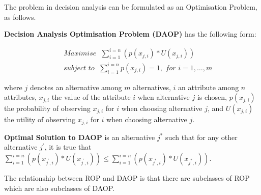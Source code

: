 \documentclass[graybox]{svmult}
\newcommand{\zi}[1]{\textit{#1}}
\newcommand{\xb}[1]{\textbf{#1}}
\newcommand{\ROP}{ROP}
\begin{document}
The problem in decision analysis can be formulated as an Optimisation Problem, as follows.

\begin{definition}\label{d:daop}
\xb{Decision Analysis Optimisation Problem (DAOP)} has the following form:

\begin{eqnarray*}
& & \zi{Maximise }\; \sum_{i=1}^{i=n}(p(x_{j,i}) * U(x_{j,i})) \\
& & \zi{subject to }\; \sum_{i=1}^{i=n}p(x_{j,i}) = 1, \zi{ for } i = 1, \ldots, m
\end{eqnarray*}

where $j$ denotes an alternative among $m$ alternatives, $i$ an attribute among $n$ attributes, $x_{j,i}$ the value of the attribute $i$ when alternative $j$ is chosen, $p(x_{j,i})$ the probability of observing $x_{j,i}$ for $i$ when choosing alternative $j$, and $U(x_{j,i})$ the utility of observing $x_{j,i}$ for $i$ when choosing alternative $j$. 
\end{definition}

\begin{definition}\label{d:daop-solution}
\xb{Optimal Solution to DAOP} is an alternative $j^{\ast}$ such that for any other alternative $j^{\prime}$, it is true that $\sum_{i=1}^{i=n}( p(x_{j^{\prime},i}) * U(x_{j^{\prime},i}) ) \leq \sum_{i=1}^{i=n}( p(x_{j^{\ast},i}) * U(x_{j^{\ast},i}) )$.
\end{definition}

The relationship between \ROP{} and DAOP is that there are subclasses of \ROP{} which are also subclasses of DAOP.
\end{document}
